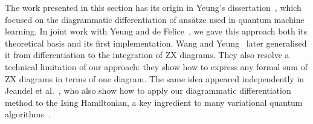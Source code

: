 The work presented in this section has its origin in Yeung's dissertation~\cite{Yeung20}, which focused on the diagrammatic differentiation of ansätze used in quantum machine learning.
In joint work with Yeung and de Felice~\cite{ToumiEtAl21}, we gave this approach both its theoretical basis and its first implementation.
Wang and Yeung~\cite{WangYeung22} later generalised it from differentiation to the integration of ZX diagrams.
They also resolve a technical limitation of our approach: they show how to express any formal sum of ZX diagrams in terms of one diagram.
The same idea appeared independently in Jeandel et al.~\cite{JeandelEtAl22}, who also show how to apply our diagrammatic differentiation method to the Ising Hamiltonian, a key ingredient to many variational quantum algorithms~\cite{Hadfield21}.
